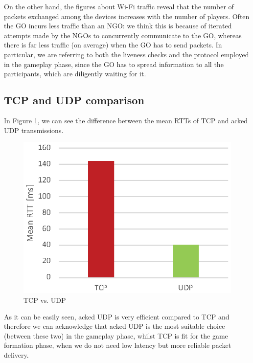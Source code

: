 On the other hand, the figures about Wi-Fi traffic reveal that the number of
packets exchanged among the devices increases with the number of players. Often
the GO incurs less traffic than an NGO: we think this is because of iterated
attempts made by the NGOs to concurrently communicate to the GO, whereas
there is far less traffic (on average) when the GO has to send packets. In
particular, we are referring to both the liveness checks and the protocol
employed in the gameplay phase, since the GO has to spread information to all
the participants, which are diligently waiting for it.

\subsection{TCP and UDP comparison}

In Figure \ref{fig:TCP-UDP}, we can see the difference between the mean RTTs of
TCP and acked UDP transmissions.

\begin{figure}[H]
  \centering
  \includegraphics[width=.8\columnwidth]{img/UDPvsTCP-RTT.eps}
  \caption{TCP vs. UDP}
  \label{fig:TCP-UDP}
\end{figure}

As it can be easily seen, acked UDP is very efficient compared to TCP and
therefore we can acknowledge that acked UDP is the most suitable choice (between
these two) in the gameplay phase, whilst TCP is fit for the game formation
phase, when we do not need low latency but more reliable packet delivery.
